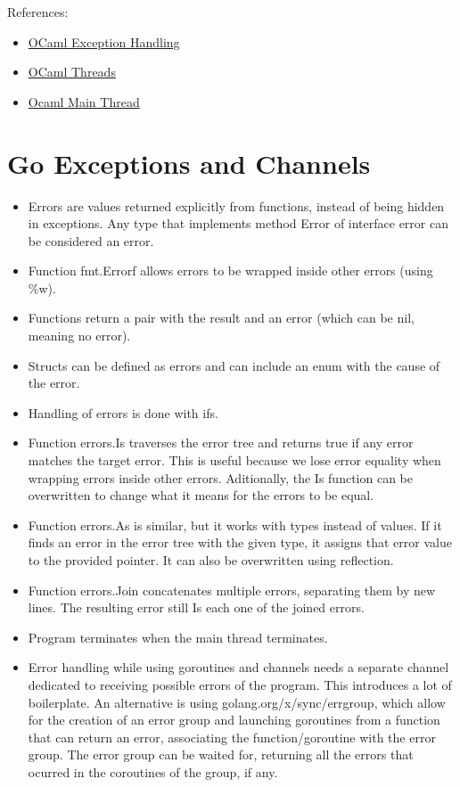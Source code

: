 \documentclass[a4paper,11pt]{article}
\theoremstyle{plain}
\theoremstyle{nonumberplain}
\begin{document}
References:

\begin{itemize}
  \item \href{https://ocaml.org/docs/error-handling}{OCaml Exception Handling}
  \item \href{https://ocaml.org/manual/5.5/api/Thread.html}{OCaml Threads}
  \item \href{https://stackoverflow.com/questions/4666628/do-child-threads-exit-when-the-parent-thread-terminates}{Ocaml Main Thread}
\end{itemize}

\section{Go Exceptions and Channels}

\begin{itemize}
  \item Errors are values returned explicitly from functions, instead of being hidden in exceptions. Any type that implements method Error of interface error can be considered an error.
  \item Function fmt.Errorf allows errors to be wrapped inside other errors (using \%w).
  \item Functions return a pair with the result and an error (which can be nil, meaning no error).
  \item Structs can be defined as errors and can include an enum with the cause of the error.
  \item Handling of errors is done with ifs.
  \item Function errors.Is traverses the error tree and returns true if any error matches the target error. This is useful because we lose error equality when wrapping errors inside other errors. Aditionally, the Is function can be overwritten to change what it means for the errors to be equal.
  \item Function errors.As is similar, but it works with types instead of values. If it finds an error in the error tree with the given type, it assigns that error value to the provided pointer. It can also be overwritten using reflection.
  \item Function errors.Join concatenates multiple errors, separating them by new lines. The resulting error still Is each one of the joined errors.
  \item Program terminates when the main thread terminates.
  \item Error handling while using goroutines and channels needs a separate channel dedicated to receiving possible errors of the program. This introduces a lot of boilerplate. An alternative is using golang.org/x/sync/errgroup, which allow for the creation of an error group and launching goroutines from a function that can return an error, associating the function/goroutine with the error group. The error group can be waited for, returning all the errors that ocurred in the coroutines of the group, if any.
\end{itemize}
\end{document}
